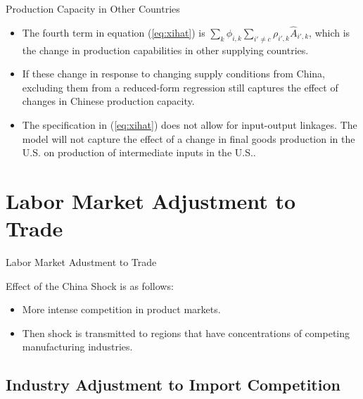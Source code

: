 \documentclass[aspectratio=169]{beamer}
\begin{document}

\begin{frame}{Production Capacity in Other Countries}

\begin{itemize}
    \item<1-> The fourth term in equation (\ref{eq:xihat}) is $ \sum_{k} \phi_{i,k} \sum_{i' \neq c} \rho_{i',k} \hat{A}_{i',k} $, which is the change in production capabilities in other supplying countries.
    \item<2-> If these change in response to changing supply conditions from China, excluding them from a reduced-form regression still captures the effect of changes in Chinese production capacity.
    \item<3-> The specification in (\ref{eq:xihat}) does not allow for input-output linkages.  The model will not capture the effect of a change in final goods production in the U.S. on production of intermediate inputs in the U.S..
\end{itemize}
    
\end{frame}


\section{Labor Market Adjustment to Trade}


\begin{frame}{Labor Market Adustment to Trade}

Effect of the China Shock is as follows:

\begin{itemize}
    \item<1-> More intense competition in product markets.
    \item<2-> Then shock is transmitted to regions that have concentrations of competing manufacturing industries.
\end{itemize}
    
\end{frame}


\subsection{Industry Adjustment to Import Competition}
\end{document}
